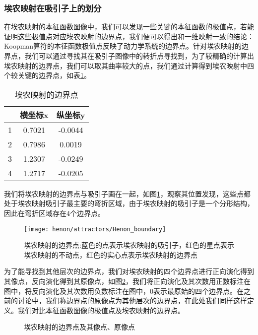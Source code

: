 \subsubsection{埃农映射在吸引子上的划分}
在埃农映射的本征函数图像中，我们可以发现一些关键的本征函数的极值点，若能证明这些极值点对应埃农映射的边界点，我们便可以得出和一维映射一致的结论：Koopman算符的本征函数极值点反映了动力学系统的边界点。针对埃农映射的边界点，我们可以通过寻找其在吸引子图像中的转折点寻找到，为了较精确的计算出埃农映射的边界点，我们可以取其曲率较大的点，我们通过计算得到埃农映射中四个较关键的边界点，如表\ref{tab:henon_boundary}。
\begin{table}[]
    \centering
    \begin{tabular}{|c|c|c|}
    \hline
        & 横坐标x & 纵坐标y  \\ \hline
    1   & 0.7021 & -0.0044 \\ \hline
    2   & 0.7986 & 0.0019  \\ \hline
    3   & 1.2307 & -0.0249 \\ \hline
    4   & 1.2717 & -0.0205 \\ \hline
    \end{tabular}
    \caption{埃农映射的边界点}\label{tab:henon_boundary}
\end{table}
我们将埃农映射的边界点与吸引子画在一起，如图\ref{fig:henon_boundary}，观察其位置发现，这些点都处于埃农映射吸引子最主要的弯折区域，由于埃农映射的吸引子是一个分形结构，因此在弯折区域存在4个边界点。
\begin{figure}
	\centering
	\texttt{[image: henon/attractors/Henon\_boundary]}
    \caption[埃农映射的边界点]{埃农映射的边界点:蓝色的点表示埃农映射的吸引子，红色的星点表示埃农映射的不动点，红色的实心点表示埃农映射的边界点}\label{fig:henon_boundary}
\end{figure}
为了能寻找到其他层次的边界点，我们对埃农映射的四个边界点进行正向演化得到其像点，反向演化得到其原像点，如图\ref{fig:Henon_boundary_forward}，我们将正向演化及其次数用正数标注在图中，将反向演化及其次数用负数标注在图中，$0$表示最原始的四个边界点。在之前的讨论中，我们称边界点的原像点为其他层次的边界点，在此处我们同样这样定义。我们对比本征函数图像的极值点及埃农映射的边界点。
\begin{figure}
    \centering
    \caption{埃农映射的边界点及其像点、原像点}\label{fig:Henon_boundary_forward}
\end{figure}

